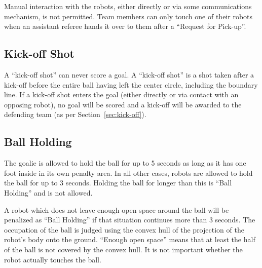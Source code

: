 \documentclass[12pt]{article}
\begin{document}
Manual interaction with the robots, either directly or via some communications mechanism, is not permitted. Team members can only touch one of their robots when an assistant referee hands it over to them after a ``Request for Pick-up''.

\subsection{Kick-off Shot}
\label{sec:kick-off_shot}

A ``kick-off shot'' can never score a goal. A ``kick-off shot'' is a shot taken after a kick-off before the entire ball having left the center circle, including the boundary line. If a kick-off shot enters the goal (either directly or via contact with an opposing robot), no goal will be scored and a kick-off will be awarded to the defending team (as per Section~\ref{sec:kick-off}).

\subsection{Ball Holding}
\label{sec:ball_holding}

The goalie is allowed to hold the ball for up to 5 seconds as long as it has one foot inside in its own penalty area. In all other cases, robots are allowed to hold the ball for up to 3 seconds. Holding the ball for longer than this is ``Ball Holding'' and is not allowed.

A robot which does not leave enough open space around the ball will be penalized as ``Ball Holding'' if that situation continues more than 3 seconds. The occupation of the ball is judged using the convex hull of the projection of the robot's body onto the ground. ``Enough open space'' means that at least the half of the ball is not covered by the convex hull. It is not important whether the robot actually touches the ball.
\end{document}
